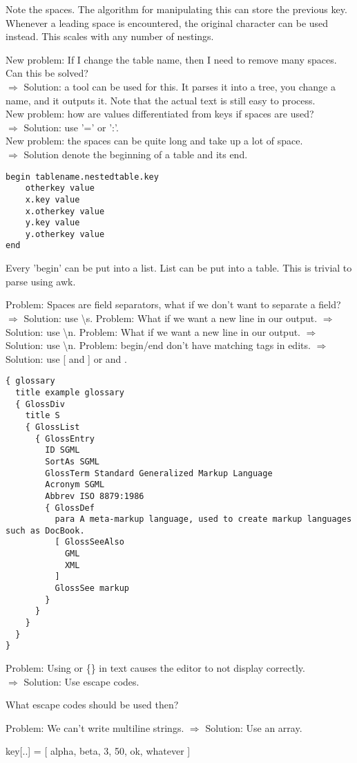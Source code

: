 \documentclass[listof=totoc]{article}
\begin{document}
Note the spaces. The algorithm for manipulating this can store the previous key. Whenever a leading space is
encountered, the original character can be used instead. This scales with any number of nestings.

New problem: If I change the table name, then I need to remove many spaces. Can this be solved?\\
$\Rightarrow$ Solution: a tool can be used for this. It parses it into a tree, you change a name, and it outputs it. Note that the actual text is still easy to process.\\
New problem: how are values differentiated from keys if spaces are used?\\
$\Rightarrow$ Solution: use '=' or ':'.\\
New problem: the spaces can be quite long and take up a lot of space.\\
$\Rightarrow$ Solution denote the beginning of a table and its end.\\

\begin{verbatim}
begin tablename.nestedtable.key
	otherkey value
	x.key value
	x.otherkey value
	y.key value
	y.otherkey value
end
\end{verbatim}

Every 'begin' can be put into a list. List can be put into a table.
This is trivial to parse using awk.

Problem: Spaces are field separators, what if we don't want to separate a field?\\
$\Rightarrow$ Solution: use \textbackslash s.
Problem: What if we want a new line in our output.
$\Rightarrow$ Solution: use \textbackslash n.
Problem: What if we want a new line in our output.
$\Rightarrow$ Solution: use \textbackslash n.
Problem: begin/end don't have matching tags in edits.
$\Rightarrow$ Solution: use [ and ] or { and }.

\begin{verbatim}
{ glossary
  title example glossary
  { GlossDiv
    title S
    { GlossList
      { GlossEntry
        ID SGML
        SortAs SGML
        GlossTerm Standard Generalized Markup Language
        Acronym SGML
        Abbrev ISO 8879:1986
        { GlossDef
          para A meta-markup language, used to create markup languages such as DocBook.
          [ GlossSeeAlso
            GML
            XML
          ]
          GlossSee markup
        }
      }
    }
  }
}
\end{verbatim}

Problem: Using \lbrack \rbrack or \{\} in text causes the editor to not display correctly.\\
$\Rightarrow$ Solution: Use escape codes.

What escape codes should be used then?

Problem: We can't write multiline strings.
$\Rightarrow$ Solution: Use an array.

key[..] = [ alpha, beta, 3, 50, ok, whatever ]
\end{document}
